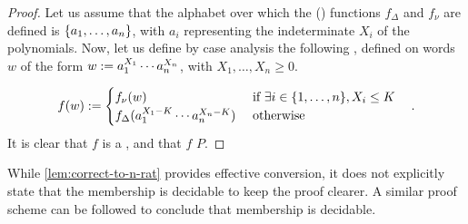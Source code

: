 \begin{proof}
    Let us assume that the alphabet over which the () functions
    $f_\Delta$ and $f_\nu$ are defined is $\mathopen{\{} a_1, \dots, a_n \mathclose{\}}$, with $a_i$
    representing the indeterminate $X_i$ of the polynomials. Now, let us define
    by case analysis the following  , defined on words $w$ of the form $w \mathrel{:=}
    a_1^{X_1} \cdots a_n^{X_n}$, with $X_1, \dots, X_n \geq 0$.

    \begin{equation*}
        f(w) \mathrel{:=}
        \begin{cases}
            f_\nu(w) & \text{ if } \exists i \in \mathopen{\{} 1, \dots, n \mathclose{\}}, X_i \leq K \\
            f_\Delta(a_1^{X_1 - K} \cdots a_n^{X_n - K}) & \text{ otherwise }
        \end{cases}
        \quad .
    \end{equation*}
    It is clear that
    $f$ is a  ,
    and that
    $f$  $P$.
\end{proof}

While \cref{lem:correct-to-n-rat} provides effective conversion, it does not
explicitly state that the membership is decidable to keep the proof clearer. A
similar proof scheme can be followed to conclude that membership is decidable.


